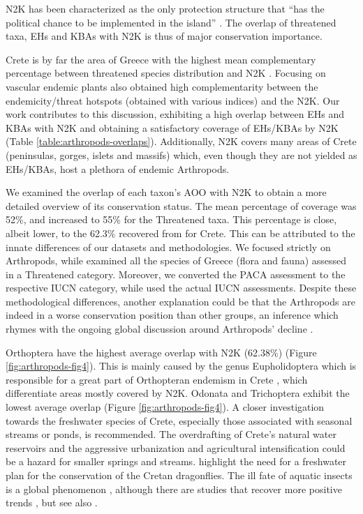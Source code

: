 N2K has been characterized as the only protection structure that “has the
political chance to be implemented in the island” \parencite{dimitrakopoulos2004questioning}.
The overlap of threatened taxa, EHs and KBAs with N2K is thus of major
conservation importance. 

Crete is by far the area of Greece with the highest mean complementary
percentage between threatened species distribution and N2K \parencite{spiliopoulou2021the-natura}.
Focusing on vascular endemic plants \textcite{kougioumoutzis2021plant} also obtained
high complementarity between the endemicity/threat hotspots
(obtained with various indices) and the N2K. Our work contributes to this
discussion, exhibiting a high overlap between EHs and KBAs with N2K and
obtaining a satisfactory coverage of  EHs/KBAs by N2K (Table \ref{table:arthropods-overlaps}).
Additionally, N2K covers many areas of Crete (peninsulas, gorges, islets and
massifs) which, even though they are not yielded as EHs/KBAs, host a plethora
of endemic Arthropods.

We examined the overlap of each taxon’s AOO with N2K to obtain a more detailed
overview of its conservation status. The mean percentage of coverage was 52\%,
and increased to 55\% for the Threatened taxa. This percentage is close, albeit
lower, to the 62.3\% recovered from \textcite{spiliopoulou2021the-natura} for Crete. This
can be attributed to the innate differences of our datasets and methodologies.
We focused strictly on Arthropods, while \textcite{spiliopoulou2021the-natura} examined
all the species of Greece (flora and fauna) assessed in a Threatened category.
Moreover, we converted the PACA assessment to the respective IUCN category,
while \textcite{spiliopoulou2021the-natura} used the actual IUCN assessments. Despite
these methodological differences, another explanation could be that the
Arthropods are indeed in a worse conservation position than other groups, an
inference which rhymes with the ongoing global discussion around Arthropods’
decline \parencite{chowdhury2023protected,chowdhury2023three-quarters}.

Orthoptera have the highest average overlap with N2K (62.38\%) (Figure \ref{fig:arthropods-fig4}).
This is mainly caused by the genus Eupholidoptera which is responsible for a
great part of Orthopteran endemism in Crete \parencite{willemse2023a-review}, which
differentiate areas mostly covered by N2K. Odonata and Trichoptera exhibit the
lowest average overlap (Figure \ref{fig:arthropods-fig4}). A closer investigation towards the
freshwater species of Crete, especially those associated with seasonal streams
or ponds, is recommended. The overdrafting of Crete’s natural water reservoirs
and the aggressive urbanization and agricultural intensification could be a
hazard for smaller springs and streams. \textcite{kalkman2010} highlight the
need for a freshwater plan for the conservation of the Cretan dragonflies.
The ill fate of aquatic insects is a global phenomenon \parencite{deacon2019aquatic,dias-silva2021protected,roth2020long-term},
although there are studies that recover more positive trends \parencite{klink2020meta-analysis}, but see also \parencite{desquilbet2020comment}.

